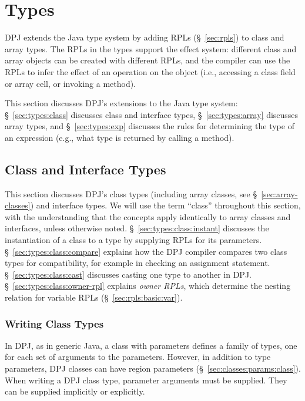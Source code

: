 \section{Types%
\label{sec:types}}

DPJ extends the Java type system by adding RPLs (\S~\ref{sec:rpls}) to
class and array types.  The RPLs in the types support the effect
system: different class and array objects can be created with
different RPLs, and the compiler can use the RPLs to infer the effect
of an operation on the object (i.e., accessing a class field or array
cell, or invoking a method).

This section discusses DPJ's extensions to the Java type system:
\S~\ref{sec:types:class} discusses class and interface types,
\S~\ref{sec:types:array} discusses array types, and
\S~\ref{sec:types:exp} discusses the rules for determining the type of
an expression (e.g., what type is returned by calling a method).

\subsection{Class and Interface Types
\label{sec:types:class}}

This section discusses DPJ's class types (including array classes, see
\S~\ref{sec:array-classes}) and interface types.  We will use the term
``class'' throughout this section, with the understanding that the
concepts apply identically to array classes and interfaces, unless
otherwise noted.  \S~\ref{sec:types:class:instant} discusses the
instantiation of a class to a type by supplying RPLs for its
parameters.  \S~\ref{sec:types:class:compare} explains how the DPJ
compiler compares two class types for compatibility, for example in
checking an assignment statement.  \S~\ref{sec:types:class:cast}
discusses casting one type to another in DPJ.
\S~\ref{sec:types:class:owner-rpl} explains \emph{owner RPLs}, which
determine the nesting relation for variable RPLs
(\S~\ref{sec:rpls:basic:var}).

\subsubsection{Writing Class Types%
\label{sec:types:class:instant}}

In DPJ, as in generic Java, a class with parameters defines a family
of types, one for each set of arguments to the parameters.  However,
in addition to type parameters, DPJ classes can have region parameters
(\S~\ref{sec:classes:params:class}).  When writing a DPJ class type,
parameter arguments must be supplied.  They can be supplied implicitly
or explicitly.

